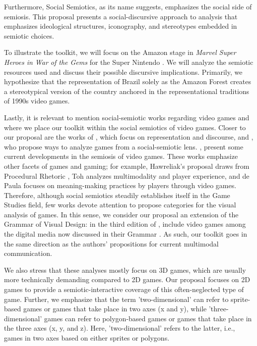 \documentclass[english]{textolivre}
\begin{document}
Furthermore, Social Semiotics, as its name suggests, emphasizes the social side of semiosis. This proposal presents a social-discursive approach to analysis that emphasizes ideological structures, iconography, and stereotypes embedded in semiotic choices.

To illustrate the toolkit, we will focus on the Amazon stage in \textit{Marvel Super Heroes in War of the Gems} for the Super Nintendo \cite{capcom_marvel_1996}. We will analyze the semiotic resources used and discuss their possible discursive implications. Primarily, we hypothesize that the representation of Brazil solely as the Amazon Forest creates a stereotypical version of the country anchored in the representational traditions of 1990s video games.

Lastly, it is relevant to mention social-semiotic works regarding video games and where we place our toolkit within the social semiotics of video games. Closer to our proposal are the works of \textcite{machin_computer_2005,machin_arab_2006,souza_world_2021}, which focus on representation and discourse, and \textcite{perez-latorre_videogame_2016}, who propose ways to analyze games from a social-semiotic lens. \textcite{hawreliak_multimodal_2018}, \textcite{toh_multimodal_2018,burn_multimodality_2018,de_paula_exploring_2021,burn_literature_2022} present some current developments in the semiosis of video games. These works emphasize other facets of games and gaming; for example, Hawreliak's proposal draws from Procedural Rhetoric \cite{bogost_persuasive_2007}, Toh analyzes multimodality and player experience, and de Paula focuses on meaning-making practices by players through video games. Therefore, although social semiotics steadily establishes itself in the Game Studies field, few works devote attention to propose categories for the visual analysis of games. In this sense, we consider our proposal an extension of the Grammar of Visual Design: in the third edition of , 
include video games among the digital media now discussed in their Grammar 
\citeyear[p.~i]{kress_reading_2020}.
As such, our toolkit goes in the same direction as the authors' propositions for current multimodal communication.

We also stress that these analyses mostly focus on 3D games, which are usually more technically demanding compared to 2D games. Our proposal focuses on 2D games to provide a semiotic-interactive coverage of this often-neglected type of game. Further, we emphasize that the term 'two-dimensional' can refer to sprite-based games \cites[p. 314-5]{wolf_video_2008}[p. 41]{wolf_encyclopedia_2021} or games that take place in two axes (x and y), while 'three-dimensional' games can refer to polygon-based games \cite[p. 315]{wolf_video_2008} or games that take place in the three axes (x, y, and z). Here, 'two-dimensional' refers to the latter, i.e., games in two axes based on either sprites or polygons.
\end{document}
